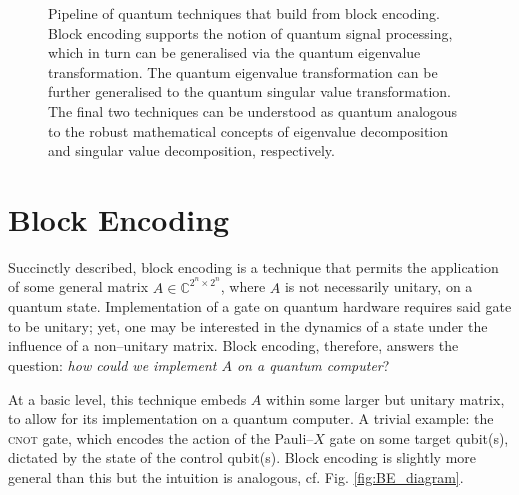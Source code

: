 \documentclass{article}
\begin{document}
\begin{figure}[!ht]
    \caption{Pipeline of quantum techniques that build from block encoding. Block encoding supports the notion of quantum signal processing, which in turn can be generalised via the quantum eigenvalue transformation. The quantum eigenvalue transformation can be further generalised to the quantum singular value transformation. The final two techniques can be understood as quantum analogous to the robust mathematical concepts of eigenvalue decomposition and singular value decomposition, respectively.}
    \label{fig:pipeline}
\end{figure}

\clearpage
\section{Block Encoding}
Succinctly described, block encoding is a technique that permits the application of some general matrix $A\in\mathbb{C}^{2^n\times 2^n}$, where $A$ is not necessarily unitary, on a quantum state. Implementation of a gate on quantum hardware requires said gate to be unitary; yet, one may be interested in the dynamics of a state under the influence of a non--unitary matrix. Block encoding, therefore, answers the question: \emph{how could we implement $A$ on a quantum computer}?

At a basic level, this technique embeds $A$ within some larger but unitary matrix, to allow for its implementation on a quantum computer. A trivial example: the \textsc{cnot} gate, which encodes the action of the Pauli--$X$ gate on some target qubit(s), dictated by the state of the control qubit(s). Block encoding is slightly more general than this but the intuition is analogous, cf. Fig. \ref{fig:BE_diagram}.
\end{document}
